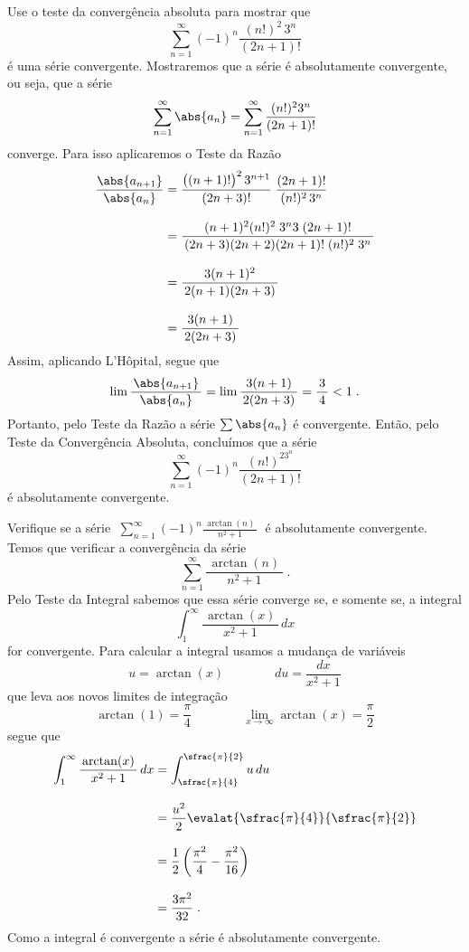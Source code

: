 \begin{example}
  Use o teste da convergência absoluta para mostrar que
  \[
    \sum_{n=1}^\infty (-1)^n\frac{(n!)^2\,3^n}{(2n+1)!}
  \]
  é uma série convergente.
  \solution
  Mostraremos que a série é absolutamente convergente, ou seja,
  que a série
  \[
    \sum_{n=1}^\infty\abs{a_n} = \sum_{n=1}^\infty \frac{(n!)^23^n}{(2n+1)!}
  \]
  converge.
  Para isso aplicaremos o Teste da Razão
  \begin{align*}
  	\frac{\abs{a_{n+1}}}{\abs{a_n}}
    & = \frac{\big((n+1)!\big)^2\, 3^{n+1}}{(2n+3)!} \; \frac{(2n+1)!}{(n!)^2\,3^n}     \\[3mm]
  	& = \frac{\,(n+1)^2 (n!)^2\; 3^{n} 3 \; (2n+1)!\,}
             {\,(2n+3)(2n+2)(2n+1)!\; (n!)^2\; 3^n\,} \\[3mm]
  	& = \frac{3(n+1)^{2}}{\,2{(n+1)}(2n+3)\,}         \\[3mm]
  	& = \frac{3(n+1)}{\,2(2n+3)\,}
  \end{align*}
  Assim, aplicando L'Hôpital, segue que
  \[
    \lim \frac{\,\abs{a_{n+1}}\,}{\abs{a_n}}
      = \lim \frac{3(n+1)}{\,2(2n+3)\,}
      = \frac{3}{\,4\,}
      < 1   \;.
  \]
  Portanto, pelo Teste da Razão a série $\sum\abs{a_n}$ é convergente.
  Então, pelo Teste da Convergência Absoluta, concluímos que a série
  \[
    \sum_{n=1}^\infty (-1)^n\frac{(n!)^23^n}{(2n+1)!}
  \]
  é absolutamente convergente.
\end{example}

\begin{example}
  Verifique se a série
  \(\;
    \sum_{n=1}^\infty (-1)^n \frac{\,\arctan(n)\,}{n^2+1}
  \;\)
  é absolutamente convergente.
  \solution
  Temos que verificar a convergência da série
  \[
    \sum_{n=1}^\infty \frac{\,\arctan(n)\,}{n^2+1}  \;.
  \]
  Pelo Teste da Integral sabemos que essa série converge se, e somente se,
  a integral
  \[
    \int_1^\infty\frac{\,\arctan(x)\,}{x^2+1}\,dx
  \]
  for convergente.
  Para calcular a integral usamos a mudança de variáveis
  \[
    u = \arctan(x)
    \qquad\qquad
    du = \frac{dx}{x^2+1}
  \]
  que leva aos novos limites de integração
  \[
    \arctan(1)=\frac{\pi}{4}
    \qquad\qquad
    \lim_{x\to \infty} \arctan(x) = \frac{\pi}{2}
  \]
  segue que
  \begin{align*}
    \int_1^\infty \frac{\,\arctan(x)\,}{x^2+1}\,dx
    & = \int_{\sfrac{\pi}{4}}^{\sfrac{\pi}{2}} u\,du             \\[3mm]
    & = \frac{u^2}{2}\evalat{\sfrac{\pi}{4}}{\sfrac{\pi}{2}}     \\[3mm]
    & = \frac{1}{2}\left(\frac{\pi^2}{4}-\frac{\pi^2}{16}\right) \\[3mm]
    & = \frac{3\pi^2}{32}  \;.
  \end{align*}
  Como a integral é convergente a série é absolutamente convergente.
\end{example}

